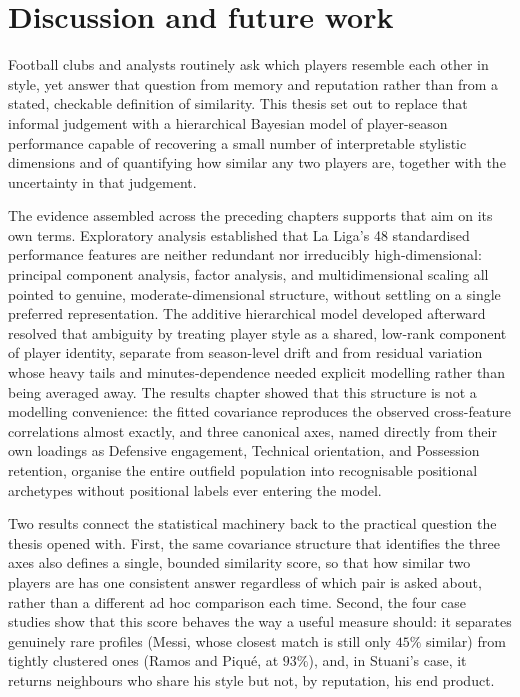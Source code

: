 \chapter{Discussion and future work}
\label{chap:conclusion}

Football clubs and analysts routinely ask which players resemble each other in style, yet
answer that question from memory and reputation rather than from a stated, checkable definition
of similarity. This thesis set out to replace that informal judgement with a hierarchical
Bayesian model of player-season performance capable of recovering a small number of
interpretable stylistic dimensions and of quantifying how similar any two players are, together
with the uncertainty in that judgement.

The evidence assembled across the preceding chapters supports that aim on its own terms.
Exploratory analysis established that La Liga's 48 standardised performance features are
neither redundant nor irreducibly high-dimensional: principal component analysis, factor
analysis, and multidimensional scaling all pointed to genuine, moderate-dimensional structure,
without settling on a single preferred representation. The additive hierarchical model
developed afterward resolved that ambiguity by treating player style as a shared, low-rank
component of player identity, separate from season-level drift and from residual variation
whose heavy tails and minutes-dependence needed explicit modelling rather than being averaged
away. The results chapter showed that this structure is not a modelling convenience: the fitted
covariance reproduces the observed cross-feature correlations almost exactly, and three
canonical axes, named directly from their own loadings as Defensive engagement, Technical
orientation, and Possession retention, organise the entire outfield population into recognisable
positional archetypes without positional labels ever entering the model.

Two results connect the statistical machinery back to the practical question the thesis opened
with. First, the same covariance structure that identifies the three axes also defines a single,
bounded similarity score, so that how similar two players are has one consistent answer
regardless of which pair is asked about, rather than a different ad hoc comparison each time.
Second, the four case studies show that this score behaves the way a useful measure should: it
separates genuinely rare profiles (Messi, whose closest match is still only $45\%$ similar) from
tightly clustered ones (Ramos and Piqué, at $93\%$), and, in Stuani's case, it returns neighbours
who share his style but not, by reputation, his end product.

